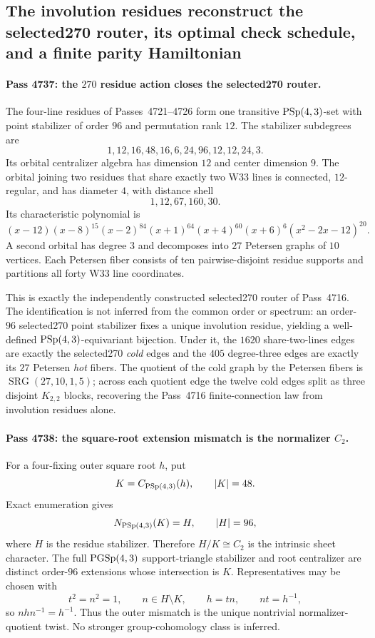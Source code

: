 \subsection*{The involution residues reconstruct the selected270 router, its optimal check schedule, and a finite parity Hamiltonian}

\paragraph{Pass 4737: the $270$ residue action closes the selected270 router.}
The four-line residues of Passes~4721--4726 form one transitive
$\mathrm{PSp}(4,3)$-set with point stabilizer of order $96$ and permutation rank $12$.
The stabilizer subdegrees are
\[
 1,12,16,48,16,6,24,96,12,12,24,3.
\]
Its orbital centralizer algebra has dimension $12$ and center dimension $9$.
The orbital joining two residues that share exactly two W33 lines is connected,
$12$-regular, and has diameter $4$, with distance shell
\[
 1,12,67,160,30.
\]
Its characteristic polynomial is
\[
 (x-12)(x-8)^{15}(x-2)^{84}(x+1)^{64}(x+4)^{60}(x+6)^6
 (x^2-2x-12)^{20}.
\]
A second orbital has degree $3$ and decomposes into $27$ Petersen graphs of
$10$ vertices.  Each Petersen fiber consists of ten pairwise-disjoint residue
supports and partitions all forty W33 line coordinates.

This is exactly the independently constructed selected270 router of
Pass~4716.  The identification is not inferred from the common order or
spectrum: an order-$96$ selected270 point stabilizer fixes a unique involution
residue, yielding a well-defined $\mathrm{PSp}(4,3)$-equivariant bijection.  Under it,
the $1620$ share-two-lines edges are exactly the selected270 \emph{cold} edges
and the $405$ degree-three edges are exactly its $27$ Petersen \emph{hot}
fibers.  The quotient of the cold graph by the Petersen fibers is
$\operatorname{SRG}(27,10,1,5)$; across each quotient edge the twelve cold
edges split as three disjoint $K_{2,2}$ blocks, recovering the Pass~4716
finite-connection law from involution residues alone.

\paragraph{Pass 4738: the square-root extension mismatch is the normalizer $C_2$.}
For a four-fixing outer square root $h$, put
\[
 K=C_{\mathrm{PSp}(4,3)}(h),\qquad |K|=48.
\]
Exact enumeration gives
\[
 N_{\mathrm{PSp}(4,3)}(K)=H,\qquad |H|=96,
\]
where $H$ is the residue stabilizer.  Therefore $H/K\cong C_2$ is the intrinsic
sheet character.  The full $\mathrm{PGSp}(4,3)$ support-triangle stabilizer and root
centralizer are distinct order-$96$ extensions whose intersection is $K$.
Representatives may be chosen with
\[
 t^2=n^2=1,\qquad n\in H\setminus K,\qquad h=tn,\qquad nt=h^{-1},
\]
so $nhn^{-1}=h^{-1}$.  Thus the outer mismatch is the unique nontrivial
normalizer-quotient twist.  No stronger group-cohomology class is inferred.

